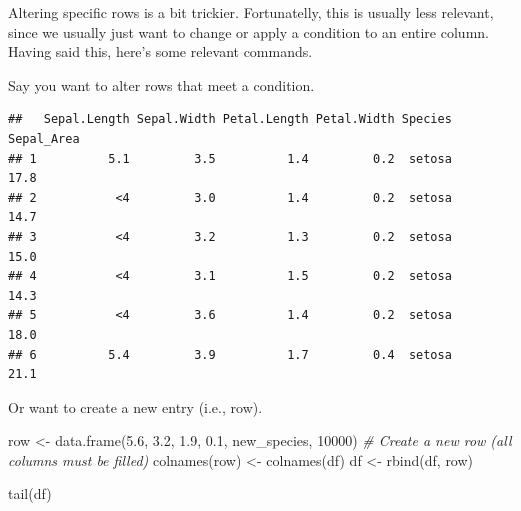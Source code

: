 \documentclass[
]{book}
\newenvironment{Shaded}{\begin{snugshade}}{\end{snugshade}}
\newcommand{\CommentTok}[1]{\textcolor[rgb]{0.56,0.35,0.01}{\textit{#1}}}
\newcommand{\DecValTok}[1]{\textcolor[rgb]{0.00,0.00,0.81}{#1}}
\newcommand{\FloatTok}[1]{\textcolor[rgb]{0.00,0.00,0.81}{#1}}
\newcommand{\FunctionTok}[1]{\textcolor[rgb]{0.00,0.00,0.00}{#1}}
\newcommand{\NormalTok}[1]{#1}
\newcommand{\OtherTok}[1]{\textcolor[rgb]{0.56,0.35,0.01}{#1}}
\newcommand{\SpecialCharTok}[1]{\textcolor[rgb]{0.00,0.00,0.00}{#1}}
\newcommand{\StringTok}[1]{\textcolor[rgb]{0.31,0.60,0.02}{#1}}
\begin{document}
Altering specific rows is a bit trickier.
Fortunatelly, this is usually less relevant, since we usually just want to change or apply a condition to an entire column.
Having said this, here's some relevant commands.

Say you want to alter rows that meet a condition.

\begin{Shaded}
\end{Shaded}

\begin{verbatim}
##   Sepal.Length Sepal.Width Petal.Length Petal.Width Species Sepal_Area
## 1          5.1         3.5          1.4         0.2  setosa       17.8
## 2           <4         3.0          1.4         0.2  setosa       14.7
## 3           <4         3.2          1.3         0.2  setosa       15.0
## 4           <4         3.1          1.5         0.2  setosa       14.3
## 5           <4         3.6          1.4         0.2  setosa       18.0
## 6          5.4         3.9          1.7         0.4  setosa       21.1
\end{verbatim}

Or want to create a new entry (i.e., row).

\begin{Shaded}
\begin{Highlighting}[]
\NormalTok{row }\OtherTok{\textless{}{-}} \FunctionTok{data.frame}\NormalTok{(}\FloatTok{5.6}\NormalTok{, }\FloatTok{3.2}\NormalTok{, }\FloatTok{1.9}\NormalTok{, }\FloatTok{0.1}\NormalTok{, }\StringTok{\textquotesingle{}new\_species\textquotesingle{}}\NormalTok{, }\DecValTok{10000}\NormalTok{)  }\CommentTok{\# Create a new row (all columns must be filled)}
\FunctionTok{colnames}\NormalTok{(row) }\OtherTok{\textless{}{-}} \FunctionTok{colnames}\NormalTok{(df)}
\NormalTok{df }\OtherTok{\textless{}{-}} \FunctionTok{rbind}\NormalTok{(df, row)}

\FunctionTok{tail}\NormalTok{(df)}
\end{Highlighting}
\end{Shaded}
\end{document}
